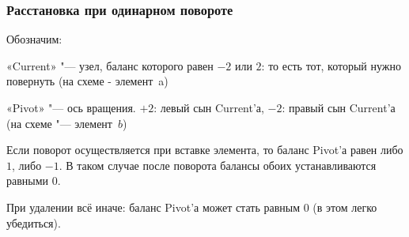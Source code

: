\begin{frame}
    \frametitle{Расстановка при одинарном повороте}

    Обозначим:

    «Current» "--- узел, баланс которого равен $-2$ или $2$:
    то есть тот, который нужно повернуть (на схеме - элемент a)

    «Pivot» "--- ось вращения. $+2$: левый сын Current'а, $-2$: правый сын Current'а (на схеме "--- элемент $b$)

    Если поворот осуществляется при вставке элемента, то баланс Pivot'а равен либо $1$, либо $-1$.
    В таком случае после поворота балансы обоих устанавливаются равными $0$.

    При удалении всё иначе: баланс Pivot'а может стать равным $0$ (в этом легко убедиться).

\end{frame}